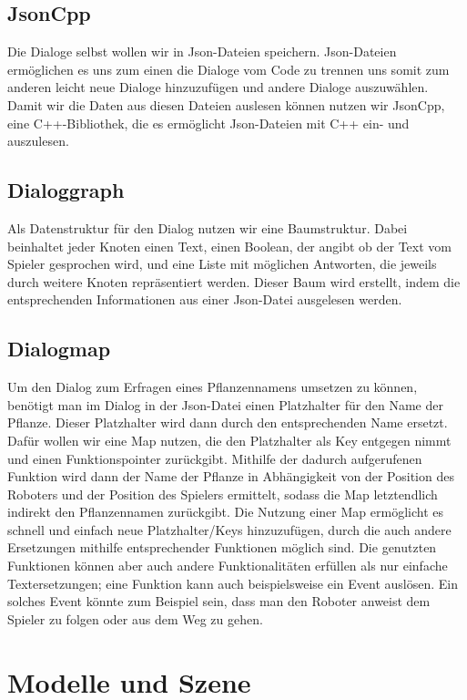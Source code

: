 \subsection{JsonCpp}

Die Dialoge selbst wollen wir in Json-Dateien speichern. Json-Dateien ermöglichen es uns zum einen die Dialoge vom Code zu trennen uns somit zum anderen leicht neue Dialoge hinzuzufügen und andere Dialoge auszuwählen. Damit wir die Daten aus diesen Dateien auslesen können nutzen wir JsonCpp, eine C++-Bibliothek, die es ermöglicht Json-Dateien mit C++ ein- und auszulesen. 

\subsection{Dialoggraph}

Als Datenstruktur für den Dialog nutzen wir eine Baumstruktur. Dabei beinhaltet jeder Knoten einen Text, einen Boolean, der angibt ob der Text vom Spieler gesprochen wird, und eine Liste mit möglichen Antworten, die jeweils durch weitere Knoten repräsentiert werden. Dieser Baum wird erstellt, indem die entsprechenden Informationen aus einer Json-Datei ausgelesen werden. 

\subsection{Dialogmap}

Um den Dialog zum Erfragen eines Pflanzennamens umsetzen zu können, benötigt man im Dialog in der Json-Datei einen Platzhalter für den Name der Pflanze. Dieser Platzhalter wird dann durch den entsprechenden Name ersetzt. Dafür wollen wir eine Map nutzen, die den Platzhalter als Key entgegen nimmt und einen Funktionspointer zurückgibt. Mithilfe der dadurch aufgerufenen Funktion wird dann der Name der Pflanze in Abhängigkeit von der Position des Roboters und der Position des Spielers ermittelt, sodass die Map letztendlich indirekt den Pflanzennamen zurückgibt.  
Die Nutzung einer Map ermöglicht es schnell und einfach neue Platzhalter/Keys hinzuzufügen, durch die auch andere Ersetzungen mithilfe entsprechender Funktionen möglich sind. Die genutzten Funktionen können aber auch andere Funktionalitäten erfüllen als nur einfache Textersetzungen; eine Funktion kann auch beispielsweise ein Event auslösen. Ein solches Event könnte zum Beispiel sein, dass man den Roboter anweist dem Spieler zu folgen oder aus dem Weg zu gehen.

\section{Modelle und Szene}

